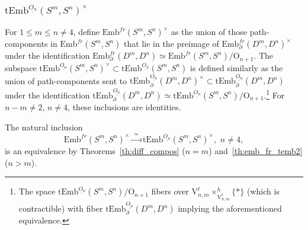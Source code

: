\documentclass[11pt]{amsart}
\theoremstyle{definition}
\newcommand{\Emb}{\mathrm{Emb}}
\newcommand{\tEmb}{\mathrm{tEmb}}
\newcommand{\TOP}{\mathrm{TOP}}
\newcommand{\OO}{\mathrm{O}}
\newcommand{\VV}{\mathrm{V}}
\numberwithin{equation}{section}
\begin{document}
%
%




\subsubsection{$\tEmb^{\underline{O_n}}(S^m,S^n)^\times$}\label{sss:spherical_fr_emb}
For $1\leq m\leq n\neq 4$,
define $\Emb^{fr}(S^m,S^n)^\times$ as the union of those path-components in $\Emb^{fr}(S^m,S^n)$ that lie in the preimage of $\Emb^{fr}_\partial(D^m,D^n)^\times$ under the identification $\Emb_\partial^{fr}(D^m,D^n)\simeq \Emb^{fr}(S^m,S^n)/\OO_{n+1}$. The subspace $\tEmb^{\underline{O_n}}(S^m,S^n)^\times \subset \tEmb^{\underline{O_n}}(S^m,S^n)$ is defined similarly as the union of path-components sent to $\tEmb_\partial^{\underline{O_n}}(D^m,D^n)^\times\subset
\tEmb_\partial^{\underline{O_n}}(D^m,D^n)$ under the identification $\tEmb_\partial^{\underline{O_n}}(D^m,D^n)\simeq \tEmb^{\underline{O_n}}(S^m,S^n)/\OO_{n+1}$.\footnote{The space $\tEmb^{\underline{O_n}}(S^m,S^n)/\OO_{n+1}$
fibers over $\VV_{n,m}^t{\times}^h_{\VV_{n,m}^t}\!\!\!\{*\}$ (which is contractible) with fiber $\tEmb_\partial^{\underline{O_n}}(D^m,D^n)$ implying the aforementioned equivalence.}
 For $n-m\neq 2$, $n\neq 4$, these inclusions are identities. 

The natural inclusion
\begin{equation}\label{eq:spherical_fr_emb}
\Emb^{fr}(S^m,S^n)^\times\xrightarrow{\,\,\simeq\,\,}\tEmb^{\underline{O_n}}(S^m,S^n)^\times,\,\, n\neq 4,
\end{equation}
is an equivalence by Theorems~\ref{th:diff_compos} ($n=m$) and~\ref{th:emb_fr_temb2} ($n>m$).
\end{document}
